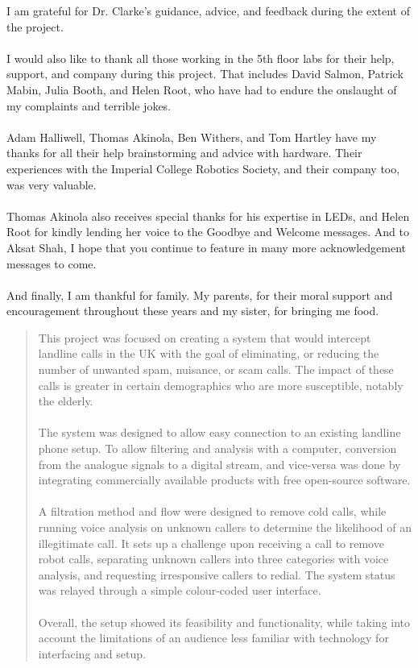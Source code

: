 \documentclass[12pt,a4paper]{report}
\begin{document}
\begin{acknowledgments}
 	I am grateful for Dr. Clarke's guidance, advice, and feedback during the extent of the project.
	\\\\
	I would also like to thank all those working in the 5th floor labs for their help, support, and company during this project. That includes David Salmon, Patrick Mabin, Julia Booth, and Helen Root, who have had to endure the onslaught of my complaints and terrible jokes.
	\\\\
	Adam Halliwell, Thomas Akinola, Ben Withers, and Tom Hartley have my thanks for all their help brainstorming and advice with hardware. Their experiences with the Imperial College Robotics Society, and their company too, was very valuable.
	\\\\
	Thomas Akinola also receives special thanks for his expertise in LEDs, and Helen Root for kindly lending her voice to the Goodbye and Welcome messages. And to Aksat Shah, I hope that you continue to feature in many more acknowledgement messages to come.
	\\\\
	And finally, I am thankful for family. My parents, for their moral support and encouragement throughout these years and my sister, for bringing me food.
\end{acknowledgments}

\begin{abstract}
This project was focused on creating a system that would intercept landline calls in the UK with the goal of eliminating, or reducing the number of unwanted spam, nuisance, or scam calls. The impact of these calls is greater in certain demographics who are more susceptible, notably the elderly.
\\\\
The system was designed to allow easy connection to an existing landline phone setup. To allow filtering and analysis with a computer, conversion from the analogue signals to a digital stream, and vice-versa was done by integrating commercially available products with free open-source software.
\\\\
A filtration method and flow were designed to remove cold calls, while running voice analysis on unknown callers to determine the likelihood of an illegitimate call. It sets up a challenge upon receiving a call to remove robot calls, separating unknown callers into three categories with voice analysis, and requesting irresponsive callers to redial. The system status was relayed through a simple colour-coded user interface.
\\\\
Overall, the setup showed its feasibility and functionality, while taking into account the limitations of an audience less familiar with technology for interfacing and setup. 
\end{abstract}
\end{document}
